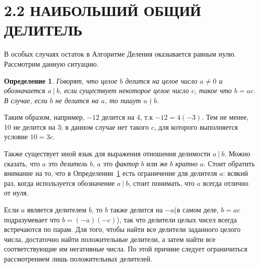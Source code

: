 \documentclass[11pt]{article}
\newtheorem{definition}{Определение}
\begin{document}
\section*{2.2 НАИБОЛЬШИЙ ОБЩИЙ ДЕЛИТЕЛЬ}
В особых случаях остаток в Алгоритме Деления оказывается равным нулю. Рассмотрим данную ситуацию.

\leftskip=0cm \rightskip=0cm\begin{definition}\label{def:2-1} Говорят, что целое $b$ \textit{делится} на целое число $a\neq 0$ и обозначается $a\ |\  b$, если существует некоторое целое число $c$, такое что $b=ac$. В случае, если $b$ не делится на $a$, то пишут $a\nmid b$.\end{definition}

\leftskip=-0.9cm \rightskip=-0.9cm \qquad \quad Таким образом, например, $-12$ делится на 4, т.к $-12=4(-3)$. Тем не менее, 10 не делится на 3; в данном случае нет такого $c$, для которого выполняется условие $10=3c$. 

\qquad \quad Также существует иной язык для выражения отношения делимости $a\ |\ b$. Можно сказать, что $a$ это \textit{делитель} $b$, $a$ это \textit{фактор} $b$ или же $b$ \textit{кратно} $a$. Стоит обратить внимание на то, что в Определении~\ref{def:2-1} есть ограничение для делителя $a$: всякий раз, когда используется обозначение $a\ |\ b$, стоит понимать, что $a$ всегда отлично от нуля.

\qquad \quad Если $a$ является делителем $b$, то $b$ также делится на $-a$(в самом деле, $b=ac$ подразумевает что $b=(-a)(-c)$), так что делители целых чисел всегда встречаются по парам. Для того, чтобы найти все делители заданного целого числа, достаточно найти положительные делители, а затем найти все соответствующие им негативные числа. По этой причине следует ограничиться рассмотрением лишь положительных делителей. 
\end{document}
